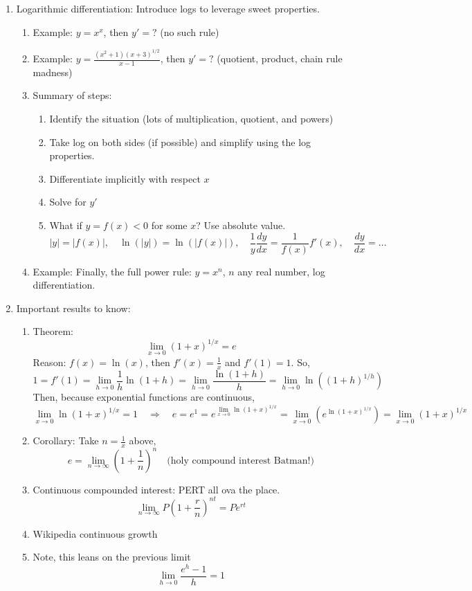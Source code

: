 \documentclass{article}
\begin{document}
\begin{enumerate}
\item Logarithmic differentiation: Introduce logs to leverage sweet properties.
\begin{enumerate}
\item Example: $y = x^x$, then $y'=?$ (no such rule)
\item Example: $y = \frac{(x^2+1)(x+3)^{1/2}}{x-1}$, then $y'=?$ (quotient, product, chain rule madness)
\item Summary of steps: 
\begin{enumerate}
\item  Identify the situation (lots of multiplication, quotient, and powers)
\item Take log on both sides (if possible) and simplify using the log properties.
\item Differentiate implicitly with respect $x$
\item Solve for $y'$
\item What if $y=f(x)<0$ for some $x$? Use absolute value.
$$
|y|=|f(x)|, \quad \ln(|y|)=\ln(|f(x)|), \quad \frac{1}{y}\frac{dy}{dx} = \frac{1}{f(x)}f'(x), \quad \frac{dy}{dx}=\dots 
$$
\end{enumerate}
\item Example: Finally, the full power rule: $y = x^n$, $n$ any real number, log differentiation.
\end{enumerate}


\item Important results to know:
\begin{enumerate}
\item Theorem:
$$
\lim_{x\rightarrow 0} (1+x)^{1/x} = e
$$
Reason: $f(x)=\ln(x)$, then $f'(x)=\frac{1}{x}$ and $f'(1)=1$. So,
$$
1=f'(1)=\lim_{h\rightarrow 0} \frac{1}{h}\ln(1+h)=\lim_{h\rightarrow 0} \frac{\ln(1+h)}{h}=\lim_{h\rightarrow 0} \ln((1+h)^{1/h})
$$
Then, because exponential functions are continuous,
$$
\lim_{x\rightarrow 0}\ln(1+x)^{1/x} = 1 \quad \Rightarrow \quad e=e^1=e^{\lim_{x\rightarrow 0}\ln(1+x)^{1/x}} = \lim_{x\rightarrow 0} (e^{\ln(1+x)^{1/x}})=\lim_{x\rightarrow 0} (1+x)^{1/x}
$$
\item Corollary: Take $n=\frac{1}{x}$ above,
$$
e=\lim_{n\rightarrow \infty}(1+\frac{1}{n})^n \quad \text{(holy compound interest Batman!)}
$$
\item Continuous compounded interest: PERT all ova the place.
$$
\lim_{n\rightarrow \infty}P(1+\frac{r}{n})^{nt}  = Pe^{rt}
$$
\item Wikipedia continuous growth
\item Note, this leans on the previous limit
\[
\lim_{h \rightarrow 0} \frac{e^h-1}{h} = 1
\]
\end{enumerate}
\end{enumerate}
\end{document}
